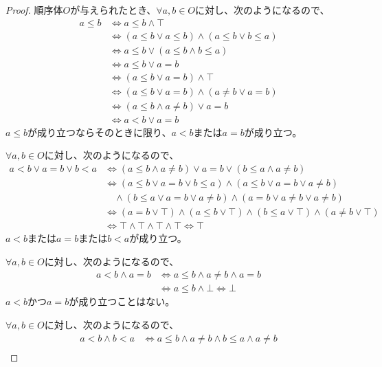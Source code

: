 \documentclass[dvipdfmx]{jsarticle}
\begin{document}
\begin{proof}
順序体$O$が与えられたとき、$\forall a,b \in O$に対し、次のようになるので、
\begin{align*}
a \leq b &\Leftrightarrow a \leq b \land \top\\ 
&\Leftrightarrow (a \leq b \vee a \leq b) \land (a \leq b \vee b \leq a)\\ 
&\Leftrightarrow a \leq b \vee (a \leq b \land b \leq a)\\ 
&\Leftrightarrow a \leq b \vee a = b\\ 
&\Leftrightarrow (a \leq b \vee a = b) \land \top\\ 
&\Leftrightarrow (a \leq b \vee a = b) \land (a \neq b \vee a = b)\\ 
&\Leftrightarrow (a \leq b \land a \neq b) \vee a = b\\ 
&\Leftrightarrow a < b \vee a = b
\end{align*}
$a \leq b$が成り立つならそのときに限り、$a < b$または$a = b$が成り立つ。\par
$\forall a,b \in O$に対し、次のようになるので、
\begin{align*}
a < b \vee a = b \vee b < a &\Leftrightarrow (a \leq b \land a \neq b) \vee a = b \vee (b \leq a \land a \neq b)\\ 
&\Leftrightarrow (a \leq b \vee a = b \vee b \leq a) \land (a \leq b \vee a = b \vee a \neq b) \\
&\quad \land (b \leq a \vee a = b \vee a \neq b) \land (a = b \vee a \neq b \vee a \neq b)\\ 
&\Leftrightarrow (a = b \vee \top) \land (a \leq b \vee \top) \land (b \leq a \vee \top) \land (a \neq b \vee \top)\\ 
&\Leftrightarrow \top \land \top \land \top \land \top \Leftrightarrow \top
\end{align*}
$a < b$または$a = b$または$b < a$が成り立つ。\par
$\forall a,b \in O$に対し、次のようになるので、
\begin{align*}
a < b \land a = b &\Leftrightarrow a \leq b \land a \neq b \land a = b\\ 
&\Leftrightarrow a \leq b \land \bot \Leftrightarrow \bot
\end{align*}
$a < b$かつ$a = b$が成り立つことはない。\par
$\forall a,b \in O$に対し、次のようになるので、
\begin{align*}
a < b \land b < a &\Leftrightarrow a \leq b \land a \neq b \land b \leq a \land a \neq b\\ 

\end{align*}
\end{proof}
\end{document}
